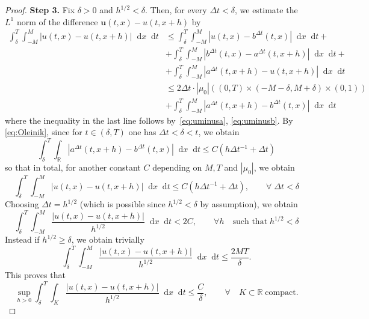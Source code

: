 \documentclass[11pt, twoside, reqno]{amsart}
\theoremstyle{definition}
\theoremstyle{remark}
\numberwithin{equation}{section}
\newcommand*\dif{\mathop{}\!\mathrm{d}}
\newcommand{\bs}[1]{\boldsymbol{#1}}
\begin{document}
\begin{proof}
\vspace{0.5cm}
\textbf{Step 3.} Fix $\delta > 0$ and  $h^{1/2} < \delta$. Then, for every $\Delta t < \delta$, we estimate the $L^1$ norm of the difference $\bs u(t,x) -u(t,x+h)$ by
\begin{equation}
    \begin{aligned}
        \int_{\delta}^T \int_{-M}^M |u(t, x) -u(t, x+h)| \dif x  \dif t & \leq  \int_{\delta}^T \int_{-M}^M |u(t, x) -b^{\Delta t}(t, x)| \dif x \dif t+\\
        & + \int_{\delta}^T \int_{-M}^M |b^{\Delta t}(t, x)-a^{\Delta t}(t, x+h)| \dif x \dif t + \\
     & + \int_{\delta}^T\int_{-M}^M |a^{\Delta t}(t, x+h)-u(t, x+h)| \dif x \dif t \\
        & \leq 2 \Delta t\cdot |\mu_0|((0, T) \times (-M-\delta, M +\delta) \times (0, 1)) \\
        & + \int_{\delta}^T \int_{-M}^M |a^{\Delta t}(t, x+h)-b^{\Delta t}(t, x)| \dif x \dif t
    \end{aligned}
\end{equation}
where the inequality in the last line follows by~\eqref{eq:uminusa}, \eqref{eq:uminusb}.
By \eqref{eq:Oleinik}, since for $t \in (\delta, T)$ one has $\Delta t < \delta < t$, we obtain
$$
 \int_{\delta}^T \int _{\mathbb R} |a^{\Delta t}(t, x+h)-b^{\Delta t}(t, x)| \dif x \dif t \leq C(h\Delta t^{-1} + \Delta t)
$$
so that in total, for another constant $C$ depending on $M, T$ and $|\mu_0|$, we obtain
\begin{equation}
    \int_{\delta}^T \int_{-M}^M |u(t, x) -u(t, x+h)| \dif x  \dif t  \leq C(h\Delta t^{-1} + \Delta t), \qquad \forall \; \Delta t < \delta
\end{equation}
Choosing $\Delta t = h^{1/2}$ (which is possible since $h^{1/2} < \delta$ by assumption), we obtain 
\begin{equation}
 \int_{\delta}^T \int_{-M}^M \frac{|u(t, x) -u(t, x+h)|}{h^{1/2}} \dif x  \dif t  <2 C, \qquad \forall h \quad \text{such that} \; h^{1/2} < \delta
\end{equation}
Instead if $h^{1/2} \geq \delta$, we obtain trivially
\begin{equation}
 \int_{\delta}^T \int_{-M}^M \frac{|u(t, x) -u(t, x+h)|}{h^{1/2}} \dif x  \dif t  \leq\frac{2MT}{\delta}.
\end{equation}
This proves that
\begin{equation}
 \sup_{h > 0} \int_{\delta}^T \int_{K} \frac{|u(t, x) -u(t, x+h)|}{h^{1/2}} \dif x  \dif t  \leq \frac{C}{\delta}, \qquad \forall \quad K \subset \mathbb R \; \text{compact}.
\end{equation}
\end{proof}
\end{document}
